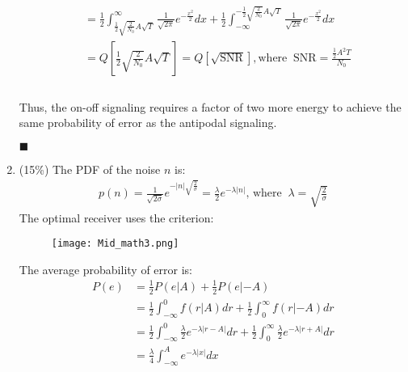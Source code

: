 \documentclass[a4paper,12pt]{article}
\begin{document}
\begin{enumerate}
\begin{align*}
                     &= \frac{1}{2}\int_{\frac{1}{2}\sqrt{\frac{2}{N_0}}A\sqrt{T}}^{\infty}\frac{1}{\sqrt{2\pi}}e^{-\frac{x^2}{2}}dx + \frac{1}{2}\int_{-\infty}^{-\frac{1}{2}\sqrt{\frac{2}{N_0}}A\sqrt{T}}\frac{1}{\sqrt{2\pi}}e^{-\frac{x^2}{2}}dx \\
                     &= Q[\frac{1}{2}\sqrt{\frac{2}{N_0}}A\sqrt{T}] = Q[\sqrt{\text{SNR}}], \text{where} \;\; \text{SNR} = \frac{\frac{1}{2}A^2T}{N_0} \\
            \end{align*} \\
            Thus, the on-off signaling requires a factor of two more energy to achieve the same probability of error as the antipodal signaling.
            \begin{flushright}
                $\blacksquare$
            \end{flushright}
        \item (15\%) 
            The PDF of the noise $n$ is: 
            \begin{align*}
                p(n) = \frac{1}{\sqrt{2\sigma}}e^{-|n|\sqrt{\frac{2}{\sigma}}} = \frac{\lambda}{2}e^{-\lambda|n|} \text{, where} \;\; \lambda = \sqrt{\frac{2}{\sigma}}
            \end{align*}
            The optimal receiver uses the criterion: 
            \begin{figure}[h]
                \centering
                \texttt{[image: Mid\_math3.png]}
            \end{figure}
            \newpage
            The average probability of error is: \\
            \begin{align*}
                P(e) &= \frac{1}{2}P(e|A) + \frac{1}{2}P(e|-A) \\
                     &= \frac{1}{2}\int_{-\infty}^{0}f(r|A)dr 
                      + \frac{1}{2}\int_{0}^{\infty}f(r|-A)dr \\
                     &= \frac{1}{2}\int_{-\infty}^{0}\frac{\lambda}{2}e^{-\lambda|r - A|}dr 
                      + \frac{1}{2}\int_{0}^{\infty}\frac{\lambda}{2}e^{-\lambda|r + A|}dr \\
                     &= \frac{\lambda}{4}\int_{-\infty}^{A}e^{-\lambda|x|}dx 

\end{align*}
\end{enumerate}
\end{document}
